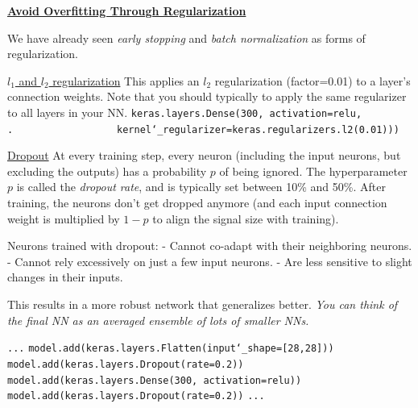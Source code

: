 \newpage

\textbf{\underline{Avoid Overfitting Through Regularization}}

We have already seen \textit{early stopping} and \textit{batch normalization} as forms of regularization.\newline

\underline{$l_1$ and $l_2$ regularization}\newline
This applies an $l_2$ regularization (factor=0.01) to a layer's connection weights.\newline
Note that you should typically to apply the same regularizer to all layers in your NN.\newline
\texttt{keras.layers.Dense(300, activation=\textquotesingle relu\textquotesingle,\newline
.~~~~~~~~~~~~~~~~~~kernel\char`_regularizer=keras.regularizers.l2(0.01)))}\newline

\underline{Dropout}\newline
At every training step, every neuron (including the input neurons, but excluding the outputs)
has a probability $p$ of being ignored.
The hyperparameter $p$ is called the \textit{dropout rate},
and is typically set between 10\% and 50\%.
After training, the neurons don't get dropped anymore (and each input connection weight is multiplied by $1-p$ to align the signal size with training).

Neurons trained with dropout:\newline
- Cannot co-adapt with their neighboring neurons.\newline
- Cannot rely excessively on just a few input neurons.\newline
- Are less sensitive to slight changes in their inputs.

This results in a more robust network that generalizes better.\newline
\textit{You can think of the final NN as an averaged ensemble of lots of smaller NNs.}

\texttt{...}\newline
\texttt{model.add(keras.layers.Flatten(input\char`_shape=[28,28]))}\newline
\texttt{model.add(keras.layers.Dropout(rate=0.2))}\newline
\texttt{model.add(keras.layers.Dense(300, activation=\textquotesingle relu\textquotesingle))}\newline
\texttt{model.add(keras.layers.Dropout(rate=0.2))}\newline
\texttt{...}\newline


